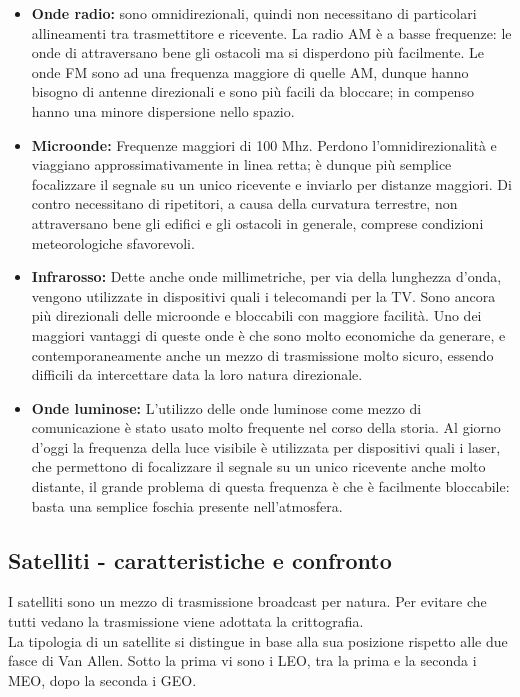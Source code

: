 \documentclass[10pt,a4paper,twoside]{article}
\begin{document}
\begin{itemize}
\item \textbf{Onde radio:} sono omnidirezionali, quindi non necessitano di particolari allineamenti tra trasmettitore e ricevente. La radio AM è a basse frequenze: le onde di attraversano bene gli ostacoli ma si disperdono più facilmente. Le onde FM sono ad una frequenza maggiore di quelle AM, dunque hanno bisogno di antenne direzionali e sono più facili da bloccare; in compenso hanno una minore dispersione nello spazio.
\item \textbf{Microonde:} Frequenze maggiori di 100 Mhz. Perdono l'omnidirezionalità e viaggiano approssimativamente in linea retta; è dunque più semplice focalizzare il segnale su un unico ricevente e inviarlo per distanze maggiori. Di contro necessitano di ripetitori, a causa della curvatura terrestre, non attraversano bene gli edifici e gli ostacoli in generale, comprese condizioni meteorologiche sfavorevoli.
\item \textbf{Infrarosso:} Dette anche onde millimetriche, per via della lunghezza d'onda, vengono utilizzate in dispositivi quali i telecomandi per la TV. Sono ancora più direzionali delle microonde e bloccabili con maggiore facilità. Uno dei maggiori vantaggi di queste onde è che sono molto economiche da generare, e contemporaneamente anche un mezzo di trasmissione molto sicuro, essendo difficili da intercettare data la loro natura direzionale.
\item \textbf{Onde luminose:} L'utilizzo delle onde luminose come mezzo di comunicazione è stato usato molto frequente nel corso della storia. Al giorno d'oggi la frequenza della luce visibile è utilizzata per dispositivi quali i laser, che permettono di focalizzare il segnale su un unico ricevente anche molto distante, il grande problema di questa frequenza è che è facilmente bloccabile: basta una semplice foschia presente nell'atmosfera.
\end{itemize}

\subsection{Satelliti - caratteristiche e confronto}
I satelliti sono un mezzo di trasmissione broadcast per natura. Per evitare che tutti vedano la trasmissione viene adottata la crittografia.\\
La tipologia di un satellite si distingue in base alla sua posizione rispetto alle due fasce di Van Allen. Sotto la prima vi sono i LEO, tra la prima e la seconda i MEO, dopo la seconda i GEO.
\end{document}
